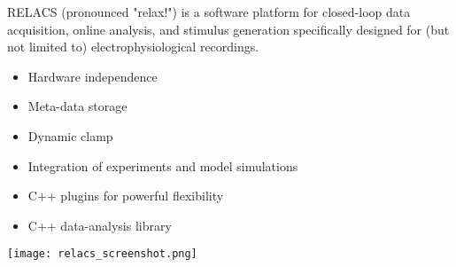 \begin{multicols}{3}

%


RELACS (pronounced "relax!") is a software platform for closed-loop data acquisition, online analysis, and stimulus generation specifically designed for (but not limited to) electrophysiological recordings.

\begin{itemize}[nolistsep,topsep=0em,leftmargin=1pc]
\item Hardware independence
\item Meta-data storage
\item Dynamic clamp
\item Integration of experiments and model simulations
\item C++ plugins for powerful flexibility
\item C++ data-analysis library
\end{itemize}

\texttt{[image: relacs\_screenshot.png]}

\end{multicols}


